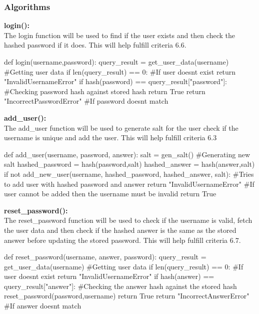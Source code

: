 \documentclass{article}
\begin{document}
        \subsubsection{Algorithms}
        \textbf{login():}\\
        The login function will be used to find if the user exists and then check the hashed password if it does. This will help fulfill criteria 6.6.\\
        \begin{python}
def login(username,password):
   query_result = get_user_data(username) #Getting user data
   if len(query_result) == 0: #If user doesnt exist
      return "InvalidUsernameError" 
   if hash(password) == query_result["password"]: #Checking password hash against stored hash
      return True
   return "IncorrectPasswordError" #If password doesnt match
        \end{python}
        \textbf{add\_user():}\\
        The add\_user function will be used to generate salt for the user check if the username is unique and add the user. This will help fulfill criteria 6.3\\
        \begin{python}
def add_user(username, password, answer):
   salt = gen_salt() #Generating new salt
   hashed_password = hash(password,salt)
   hashed_answer = hash(answer,salt)
   if not add_new_user(username, hashed_password, hashed_answer, salt): #Tries to add user with hashed password and answer
      return "InvalidUsernameError" #If user cannot be added then the username must be invalid
   return True
        \end{python}
        \textbf{reset\_password():}\\
        The reset\_password function will be used to check if the username is valid, fetch the user data and then check if the hashed answer is the same as the stored answer before updating the stored password. This will help fulfill criteria 6.7.\\
        \begin{python}
def reset_password(username, answer, password):
   query_result = get_user_data(username) #Getting user data
   if len(query_result) == 0: #If user doesnt exist
      return "InvalidUsernameError"
   if hash(answer) == query_result["answer"]: #Checking the answer hash against the stored hash
      reset_password(password,username)
      return True
   return "IncorrectAnswerError" #If answer doesnt match
        \end{python}
\end{document}
